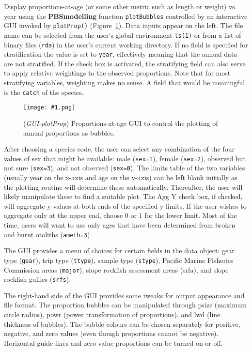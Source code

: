 \documentclass[letterpaper,12pt,fleqn]{article}
\def\tab{\hspace{0.5 in}}
\newcommand{\code}[1]{\small\texttt{#1}\normalsize}
\newcommand{\pkg}[1]{{\bf #1}}
\newcommand{\gui}[1]{\small\textmd{\textsf{#1}}\normalsize}
\newcommand\pbsfig[4]{    %
	\begin{figure}[ht!] %
	\centering
	\texttt{[image: \#1.png]}
	\ifthenelse{\isempty{#4}}
		{\caption[#2]{(\emph{#1}) #2}\vspace{-2ex}}
		{\caption[#4]{(\emph{#1}) #2}\vspace{-2ex}}
	\label{fig:#1}
	\end{figure}
}
\begin{document}
\tab Display proportions-at-age (or some other metric such as length or weight) vs. year using the \pkg{PBSmodelling} function \code{plotBubbles} controlled by an interactive GUI invoked by \code{plotProp()} (Figure~\ref{fig:GUI-plotProp}). Data inputs appear on the left. The file name can be selected from the user's global environment \code{ls(1)} or from a list of binary files (\code{rda}) in the user's current working directory. If no field is specified for stratification the value is set to \code{year}, effectively meaning that the annual data are not stratified. If the check box is activated, the stratifying field can also serve to apply relative weightings to the observed proportions. Note that for most stratifying variables, weighting makes no sense. A field that would be meaningful is the \code{catch} of the species. 

\pbsfig{GUI-plotProp}{Proportions-at-age GUI to control the plotting of annual proportions as bubbles.}{5.0}{Proportions-at-age GUI}

\tab After choosing a species code, the user can select any combination of the four values of sex that might be available: male (\code{sex=1}), female (\code{sex=2}), observed but not sure (\code{sex=3}), and not observed (\code{sex=0}). The limits table of the two variables (usually year on the x-axis and age on the y-axis) can be left blank initially as the plotting routine will determine these automatically. Thereafter, the user will likely manipulate these to find a suitable plot. The \gui{Agg Y} check box, if checked, will aggregate y-values at both ends of the specified y-limits. If the user wishes to aggregate only at the upper end, choose 0 or 1 for the lower limit. Most of the time, users will want to use only ages that have been determined from broken and burnt otoliths (\code{ameth=3}). 

\tab The GUI provides a menu of choices for certain fields in the data object: gear type (\code{gear}), trip type (\code{ttype}), sample type (\code{stype}), Pacific Marine Fisheries Commission areas (\code{major}), slope rockfish assessment areas (srfa), and slope rockfish gullies (\code{srfs}).

\tab The right-hand side of the GUI provides some tweaks for output appearance and file format. The proportion bubbles can be manipulated through \gui{psize} (maximum circle radius), \gui{powr} (power transformation of proportions), and \gui{lwd} (line thickness of bubbles). The bubble colours can be chosen separately for positive, negative, and zero values (even though proportions cannot be negative). Horizontal guide lines and zero-value proportions can be turned on or off.
\end{document}
